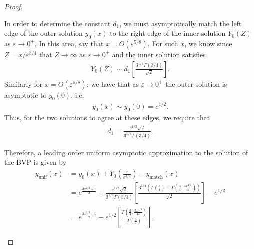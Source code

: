 \documentclass[12pt]{article}
\theoremstyle{definition}
\begin{document}
\begin{proof}
\begin{enumerate}
      In order to determine the constant $d_1$, we must asymptotically match the
      left edge of the outer solution $y_0(x)$ to the right edge of the inner solution $Y_0(Z)$ as $\varepsilon \to 0^+$.
      In this area, say that $x=O(\varepsilon^{5/8})$. For such $x$, we know since $Z = x/\varepsilon^{3/4}$ that $Z \to \infty$
      as $\varepsilon \to 0^+$ and the inner solution satisfies
      \begin{align*}
        Y_0(Z) \sim d_1\left[\frac{3^{1/4}\Gamma(3/4)}{\sqrt{2}}\right].
      \end{align*}
      Similarly for $x=O(\varepsilon^{5/8})$, we have that as $\varepsilon \to 0^+$
      the outer solution is asymptotic to $y_0(0)$, i.e.\
      \begin{align*}
        y_0(x) \sim y_0(0) = e^{1/2}.
      \end{align*}
      Thus, for the two solutions to agree at these edges, we require that
      \begin{align*}
        d_1 = \frac{e^{1/2}\sqrt{2}}{3^{1/4}\Gamma(3/4)}.
      \end{align*}

      Therefore, a leading order uniform asymptotic approximation to the solution of the BVP
      is given by
      \begin{align*}
        y_{\text{unif}}(x) &= y_0(x) + Y_0\left(\frac{x}{\varepsilon^{3/4}}\right) - y_{\text{match}}(x) \\
        &=e^{\frac{3x^{2/3} + 1}{2}} + \frac{e^{1/2}\sqrt{2}}{3^{1/4}\Gamma(3/4)}\left[\frac{3^{1/4}\left(\Gamma\left(\frac{3}{4}\right) - \Gamma\left(\frac{3}{4}, \frac{3x^{4/3}}{4\varepsilon}\right)\right)}{\sqrt{2}}\right] - e^{1/2} \\
        &=e^{\frac{3x^{2/3} + 1}{2}} - e^{1/2}\left[\frac{\Gamma\left(\frac{3}{4}, \frac{3x^{4/3}}{4\varepsilon}\right)}{\Gamma\left(\frac{3}{4}\right)}\right].
      \end{align*}
  \end{enumerate}
\end{proof}
\end{document}
